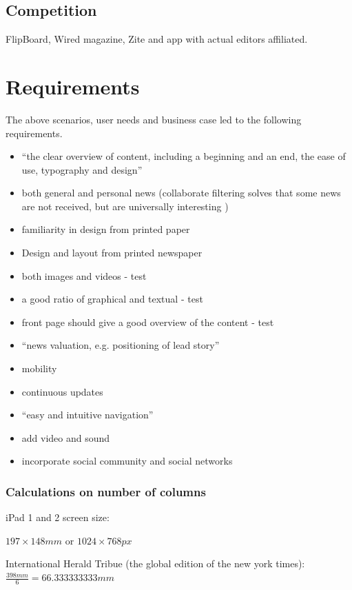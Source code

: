 \subsection{Competition}
FlipBoard, Wired magazine, Zite and app with actual editors affiliated.

\section{Requirements}
The above scenarios, user needs and business case led to the following requirements.
\begin{itemize}
	\item ``the clear overview of content, including a beginning and an end, the ease of use, typography and design'' \cite[p. 7]{FULLTEXT01.pdf}
	\item both general and personal news (collaborate filtering solves that some news are not received, but are universally interesting \cite{fulltext.pdf})
	\item familiarity in design from printed paper \cite[p. 7]{FULLTEXT01.pdf}
	\item Design and layout from printed newspaper \cite{hcii2005-1004.pdf}
	\item both images and videos - test
	\item a good ratio of graphical and textual - test
	\item front page should give a good overview of the content - test
	\item ``news valuation, e.g. positioning of lead story'' \cite[p. 7]{FULLTEXT01.pdf}
	\item  mobility \cite[p. 7]{FULLTEXT01.pdf}
	\item  continuous updates \cite[p. 7]{FULLTEXT01.pdf}
	\item ``easy and intuitive navigation'' \cite[p. 7]{FULLTEXT01.pdf}
	\item add video and sound \cite[p. 7]{FULLTEXT01.pdf}
	\item incorporate social community and social networks
\end{itemize}

\subsubsection{Calculations on number of columns}
\label{sec:column_calc}
iPad 1 and 2 screen size:

$197 \times 148mm$ or $1024 \times 768px$

International Herald Tribue (the global edition of the new york times): $\frac{398mm}{6} = 66.333333333mm$

